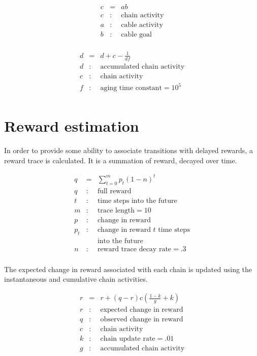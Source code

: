\documentclass[oneside,twocolumn]{article}
\begin{document}
\begin{eqnarray*}
c &= & ab\\ 
c &:& \mbox{chain activity} \\
a &:& \mbox{cable activity} \\
b &:& \mbox{cable goal}\\
\end{eqnarray*}

\begin{eqnarray*}
d &= & d + c - \frac{1}{df}\\ 
d &:& \mbox{accumulated chain activity} \\
c &:& \mbox{chain activity} \\
f &:& \mbox{aging time constant} = 10^5 \\
\end{eqnarray*}

\section*{\color{copper} Reward estimation}

In order to provide some ability to associate transitions with delayed rewards, a reward trace is calculated. It is a summation of reward, decayed over time.

\begin{eqnarray*}
q &= & \sum_{t=0}^m p_t (1 - n)^{t}\\ 
q &:& \mbox{full reward} \\
t &:& \mbox{time steps into the future} \\
m &:& \mbox{trace length} = 10\\
p &:& \mbox{change in reward}\\
p_t &:& \mbox{change in reward $t$ time steps}\\
&& \mbox{into the future}\\
n &:& \mbox{reward trace decay rate} = .3\\
\end{eqnarray*}

The expected change in reward associated with each chain is updated using the instantaneous and cumulative chain activities.

\begin{eqnarray*}
r &= & r + (q - r)c \left ( \frac{1 - k}{g} + k \right)\\ 
r &:& \mbox{expected change in reward} \\
q &:& \mbox{observed change in reward} \\
c &:& \mbox{chain activity} \\
k &:& \mbox{chain update rate} = .01 \\
g &:& \mbox{accumulated chain activity} \\
\end{eqnarray*}
\end{document}
